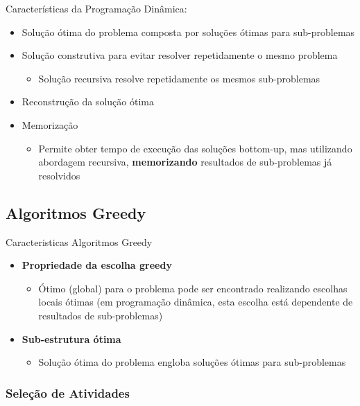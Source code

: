 \documentclass[11pt]{article}
\begin{document}
\vspace{8pt}

Características da Programação Dinâmica:
\begin{itemize}[topsep=0pt]
    \item Solução ótima do problema composta por soluções ótimas para sub-problemas
    \item Solução construtiva para evitar resolver repetidamente o mesmo problema
          \begin{itemize}
              \item Solução recursiva resolve repetidamente os mesmos sub-problemas
          \end{itemize}
    \item Reconstrução da solução ótima
    \item Memorização
          \begin{itemize}
              \item Permite obter tempo de execução das soluções bottom-up, mas
                    utilizando abordagem recursiva, \textbf{memorizando} resultados de sub-problemas já resolvidos
          \end{itemize}
\end{itemize}

\newpage

\subsection{Algoritmos Greedy} 

Caracteristicas Algoritmos Greedy
\begin{itemize}[topsep=0pt]
    \item \textbf{Propriedade da escolha greedy}
          \begin{itemize}
              \item Ótimo (global) para o problema pode ser encontrado realizando escolhas locais ótimas (em programação dinâmica, esta escolha está dependente de resultados de sub-problemas)
          \end{itemize}
    \item \textbf{Sub-estrutura ótima}
          \begin{itemize}
              \item Solução ótima do problema engloba soluções ótimas para sub-problemas
          \end{itemize}
\end{itemize}

\subsubsection{Seleção de Atividades}
\end{document}
